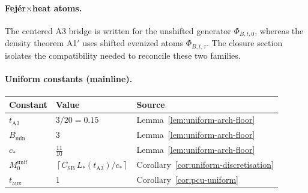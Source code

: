 \paragraph{Fej\'er$\times$heat atoms.}
The centered A3 bridge is written for the unshifted generator $\Phi_{B,t,0}$, whereas the density theorem A1$'$ uses shifted evenized atoms $\Phi_{B,t,\tau}$. The closure section isolates the compatibility needed to reconcile these two families.

\paragraph{Uniform constants (mainline).}
\begin{center}
\begin{tabular}{lll}
\toprule
Constant & Value & Source \\
\midrule
$t_{\mathrm{A3}}$ & $3/20=0.15$ & Lemma~\ref{lem:uniform-arch-floor} \\
$B_{\min}$ & $3$ & Lemma~\ref{lem:uniform-arch-floor} \\
$c_*$ & $\tfrac{11}{10}$ & Lemma~\ref{lem:uniform-arch-floor} \\
$M_0^{\mathrm{unif}}$ & $\left\lceil C_{\mathrm{SB}}\,L_*(t_{\mathrm{A3}})/c_*\right\rceil$ & Corollary~\ref{cor:uniform-discretisation} \\
$t_{\mathrm{aux}}$ & $1$ & Corollary~\ref{cor:pcu-uniform} \\
\bottomrule
\end{tabular}
\end{center}
